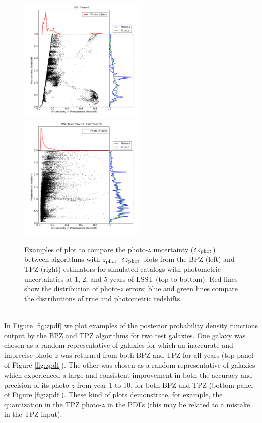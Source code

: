 \documentclass[DM,lsstdraft,toc]{lsstdoc}
\begin{document}
\begin{figure}
\begin{center}
\includegraphics[width=6cm,trim={1cm 1cm 1cm 0cm}, clip]{figures/zp_zpe_bpz_euclid_5_2.png}
\includegraphics[width=6cm,trim={1cm 1cm 1cm 0cm}, clip]{figures/zp_zpe_tpz_euclid_5_5_2.png}
\caption{Examples of plot to compare the photo-$z$ uncertainty ($\delta z_{\rm phot}$) between algorithms with $z_{\rm phot}$--$\delta z_{\rm phot}$ plots from the BPZ (left) and TPZ (right) estimators for simulated catalogs with photometric uncertainties at 1, 2, and 5 years of LSST (top to bottom). Red lines show the distribution of photo-$z$ errors; blue and green lines compare the distributions of true and photometric redshifts. \label{fig:pzpze}}
\end{center}
\end{figure}


\smallskip {} \\
In Figure \ref{fig:zpdf} we plot examples of the posterior probability density functions output by the BPZ and TPZ algorithms for two test galaxies. One galaxy was chosen as a random representative of galaxies for which an inaccurate and imprecise photo-$z$ was returned from both BPZ and TPZ for all years (top panel of Figure \ref{fig:zpdf}). The other was chosen as a random representative of galaxies which experienced a large and consistent improvement in both the accuracy and precision of its photo-$z$ from year 1 to 10, for both BPZ and TPZ (bottom panel of Figure \ref{fig:zpdf}). These kind of plots demonstrate, for example, the quantization in the TPZ photo-$z$ in the PDFs (this may be related to a mistake in the TPZ input).
\end{document}
